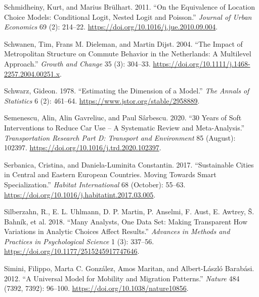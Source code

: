 \documentclass[
  11pt,
  openany]{memoir}
\newlength{\cslhangindent}
\newlength{\cslentryspacingunit} %
\newenvironment{CSLReferences}[2] %
 {%
  \setlength{\parindent}{0pt}
  \ifodd #1
  \let\oldpar\par
  \def\par{\hangindent=\cslhangindent\oldpar}
  \fi
  \setlength{\parskip}{#2\cslentryspacingunit}
 }%
 {}
\begin{document}
\begin{CSLReferences}{1}{0}
\leavevmode{}%
Schmidheiny, Kurt, and Marius Brülhart. 2011. {``On the Equivalence of Location Choice Models: Conditional Logit, Nested Logit and {Poisson}.''} \emph{Journal of Urban Economics} 69 (2): 214--22. \url{https://doi.org/10.1016/j.jue.2010.09.004}.

\leavevmode{}%
Schwanen, Tim, Frans M. Dieleman, and Martin Dijst. 2004. {``The {Impact} of {Metropolitan Structure} on {Commute Behavior} in the {Netherlands}: A {Multilevel Approach}.''} \emph{Growth and Change} 35 (3): 304--33. \url{https://doi.org/10.1111/j.1468-2257.2004.00251.x}.

\leavevmode{}%
Schwarz, Gideon. 1978. {``Estimating the {Dimension} of a {Model}.''} \emph{The Annals of Statistics} 6 (2): 461--64. \url{https://www.jstor.org/stable/2958889}.

\leavevmode{}%
Semenescu, Alin, Alin Gavreliuc, and Paul Sârbescu. 2020. {``30 {Years} of Soft Interventions to Reduce Car Use -- {A} Systematic Review and Meta-Analysis.''} \emph{Transportation Research Part D: Transport and Environment} 85 (August): 102397. \url{https://doi.org/10.1016/j.trd.2020.102397}.

\leavevmode{}%
Serbanica, Cristina, and Daniela-Luminita Constantin. 2017. {``Sustainable Cities in Central and Eastern {European} Countries. {Moving} Towards Smart Specialization.''} \emph{Habitat International} 68 (October): 55--63. \url{https://doi.org/10.1016/j.habitatint.2017.03.005}.

\leavevmode{}%
Silberzahn, R., E. L. Uhlmann, D. P. Martin, P. Anselmi, F. Aust, E. Awtrey, Š. Bahník, et al. 2018. {``Many {Analysts}, {One Data Set}: Making {Transparent How Variations} in {Analytic Choices Affect Results}.''} \emph{Advances in Methods and Practices in Psychological Science} 1 (3): 337--56. \url{https://doi.org/10.1177/2515245917747646}.

\leavevmode{}%
Simini, Filippo, Marta C. González, Amos Maritan, and Albert-László Barabási. 2012. {``A Universal Model for Mobility and Migration Patterns.''} \emph{Nature} 484 (7392, 7392): 96--100. \url{https://doi.org/10.1038/nature10856}.


\end{CSLReferences}
\end{document}
